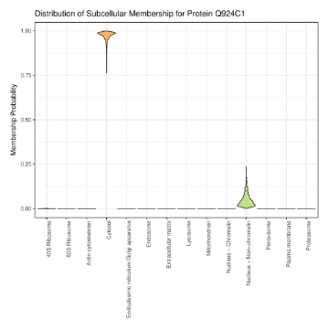 \documentclass[12pt,english]{article}\usepackage[]{graphicx}\usepackage[]{color}
\makeatletter
\def\maxwidth{ %
  \ifdim\Gin@nat@width>\linewidth
    \linewidth
  \else
    \Gin@nat@width
  \fi
}
\newenvironment{knitrout}{}{} %
\makeatother
\begin{document}
\begin{figure}[h]
  \centering
  \begin{subfigure}[t]{0.5\textwidth}
    \centering
\begin{knitrout}
\color{fgcolor}

{\centering \includegraphics[width=\maxwidth]{figure/unnamed-chunk-12-1} 

}



\end{knitrout}
    \caption{}
  \end{subfigure}%
  \begin{subfigure}[t]{0.5\textwidth}
    \centering
\begin{knitrout}
\color{fgcolor}


\end{knitrout}
\end{subfigure}
\end{figure}
\end{document}
